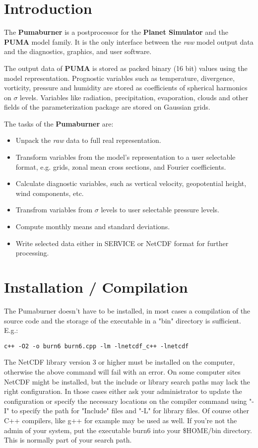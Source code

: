 \section{Introduction}

The {\bf Pumaburner} is a postprocessor for the {\bf Planet Simulator}
and the {\bf PUMA} model family.
It is the only interface between the {\it raw} model output data
and the diagnostics, graphics, and user software.

The output data of {\bf PUMA} is stored as
packed binary (16 bit) values using the model representation.
Prognostic variables such as temperature, divergence, vorticity,
pressure and humidity are stored as coefficients of spherical harmonics
on $\sigma$ levels. Variables like radiation,
precipitation, evaporation, clouds and other fields of the
parameterization package are stored on Gaussian grids.

The tasks of the {\bf Pumaburner} are:
\begin{itemize}
\item Unpack the {\it raw} data to full real representation.
\item Transform variables from the model's representation
      to a user selectable format, e.g. grids,
      zonal mean cross sections, and Fourier coefficients.
\item Calculate diagnostic variables, such as vertical velocity,
      geopotential height, wind components, etc.
\item Transfrom variables from $\sigma$ levels to user
      selectable pressure levels.
\item Compute monthly means and standard deviations.
\item Write selected data either in SERVICE or NetCDF format
      for further processing.
\end{itemize}

\section{Installation / Compilation}

The Pumaburner doesn't have to be installed, in most cases a compilation
of the source code and the storage of the executable in a "bin" directory
is sufficient. E.g.:

\begin{verbatim}
c++ -O2 -o burn6 burn6.cpp -lm -lnetcdf_c++ -lnetcdf
\end{verbatim}

The NetCDF library version 3 or higher must be installed on the computer,
otherwise the above command will fail with an error.
On some computer sites NetCDF might be installed, but the include or 
library search paths may lack the right configuration. In those cases either
ask your administrator to update the configuration or specify the
necessary locations on the compiler command using "-I" to specify the path
for "Include" files and "-L" for library files. Of course other C++ compilers,
like g++ for example may be used as well. If you're not the admin of your
system, put the executable burn6 into your \$HOME/bin directory.
This is normally part of your search path.

